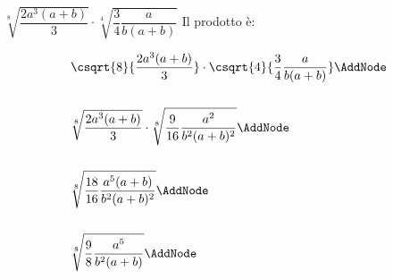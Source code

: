 \begin{exercise}
	$\sqrt[8]{\dfrac{2a^3(a+b)}{3}}\cdot\sqrt[4]{\dfrac{3}{4}\dfrac{a}{b(a+b)}}$
	\tcblower
	Il prodotto è:
	\begin{NodesList}
		\begin{align*}
			&\csqrt{8}{\dfrac{2a^3(a+b)}{3}}\cdot\csqrt{4}{\dfrac{3}{4}\dfrac{a}{b(a+b)}} \AddNode\\
			&\\
			&\sqrt[8]{\dfrac{2a^3(a+b)}{3}}\cdot\sqrt[8]{\dfrac{9}{16}\dfrac{a^2}{b^2(a+b)^2}} \AddNode\\
			&\\
			&\sqrt[8]{\dfrac{18}{16}\dfrac{a^5(a+b)}{b^2(a+b)^2}} \AddNode\\
			&\\
			&\sqrt[8]{\dfrac{9}{8}\dfrac{a^5}{b^2(a+b)}} \AddNode\\
		\end{align*}
					
				\end{NodesList}
			\end{exercise}
			
